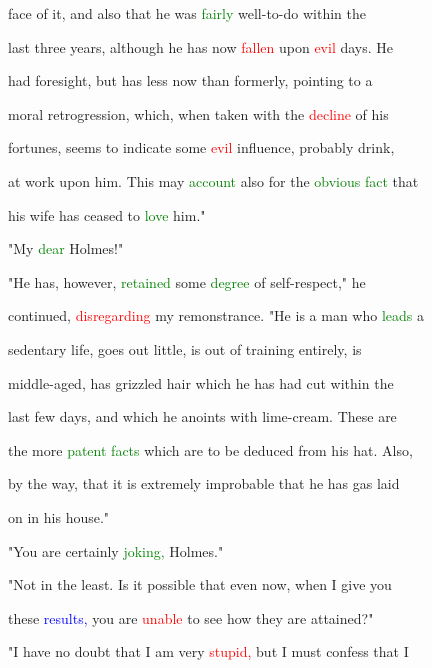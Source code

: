  face of it, and also that he was \textcolor{green}{fairly} well-to-do within the

 last three years, although he has now \textcolor{red}{fallen} upon \textcolor{red}{evil} days. He

 had \textcolor{BurntOrange}{foresight,} but has less now than formerly, pointing to a

 \textcolor{BurntOrange}{moral} retrogression, which, when taken with the \textcolor{red}{decline} of his

 \textcolor{BurntOrange}{fortunes,} seems to indicate some \textcolor{red}{evil} \textcolor{BurntOrange}{influence,} probably drink,

 at work upon him. This may \textcolor{green}{account} also for the \textcolor{green}{obvious} \textcolor{green}{fact} that

 his wife has ceased to \textcolor{green}{love} him."



 "My \textcolor{green}{dear} Holmes!"



 "He has, however, \textcolor{green}{retained} some \textcolor{green}{degree} of self-respect," he

 continued, \textcolor{red}{disregarding} my remonstrance. "He is a man who \textcolor{green}{leads} a

 sedentary life, goes out little, is out of training entirely, is

 middle-aged, has grizzled hair which he has had cut within the

 last few days, and which he anoints with lime-cream. These are

 the more \textcolor{green}{patent} \textcolor{green}{facts} which are to be deduced from his hat. Also,

 by the way, that it is extremely improbable that he has gas laid

 on in his house."



 "You are certainly \textcolor{green}{joking,} Holmes."



 "Not in the least. Is it possible that even now, when I give you

 these \textcolor{blue}{results,} you are \textcolor{red}{unable} to see how they are attained?"



 "I have no \textcolor{BurntOrange}{doubt} that I am very \textcolor{red}{stupid,} but I must \textcolor{BurntOrange}{confess} that I

